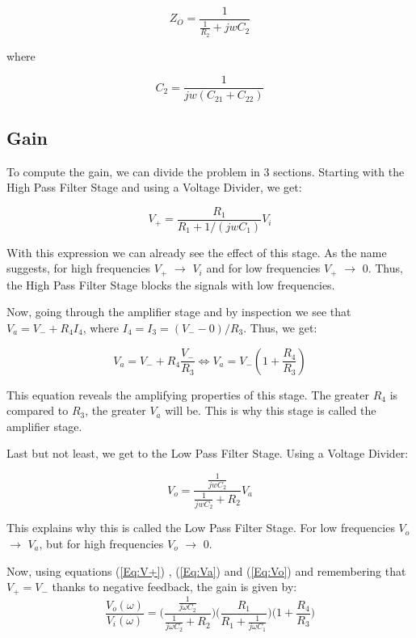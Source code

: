 \begin{equation}
Z_{O}=\frac{1}{\frac{1}{R_2}+jwC_2}
\end{equation}

where

\begin{equation}
C_2=\frac{1}{jw(C_{21}+C_{22})}
\end{equation}

\subsection{Gain}

To compute the gain, we can divide the problem in 3 sections. Starting with the High Pass Filter Stage and using a Voltage Divider, we get:

\begin{equation}
V_{+}=\frac{R_1}{R_1+1/(jwC_1)}V_i
\label{Eq:V+}
\end{equation}

With this expression we can already see the effect of this stage. As the name suggests, for high frequencies $V_{+}$ $\to$ $V_i$ and for low frequencies $V_{+}$ $\to$ $0$.
Thus, the High Pass Filter Stage blocks the signals with low frequencies.

Now, going through the amplifier stage and by inspection we see that $V_a=V_{-}+R_4I_4$, where $I_4=I_3=(V_{-}-0)/R_3$. Thus, we get:

\begin{equation}
V_a=V_{-}+R_4\frac{V_{-}}{R_3}  \Leftrightarrow V_a = V_{-}\left(1+\frac{R_4}{R_3}\right)
\label{Eq:Va}
\end{equation}

This equation reveals the amplifying properties of this stage. The greater $R_4$ is compared to $R_3$, the greater $V_a$ will be. This is why this stage is called the amplifier stage.\par

Last but not least, we get to the Low Pass Filter Stage. Using a Voltage Divider:

\begin{equation}
  V_o=\frac{\frac{1}{jwC_2}}{\frac{1}{jwC_2}+R_2}V_a
\label{Eq:Vo}
\end{equation}

This explains why this is called the Low Pass Filter Stage. For low frequencies $V_o$ $\to$ $V_a$, but for high frequencies $V_o$ $\to$ $0$.\par

Now, using equations (\ref{Eq:V+}) , (\ref{Eq:Va}) and (\ref{Eq:Vo}) and remembering that $V_{+}=V_{-}$ thanks to negative feedback, the gain is given by:
\begin{equation}
\frac{V_o(\omega)}{V_i(\omega)}=\Bigg( \frac{ \frac{1}{j\omega C_2}}{\frac{1}{j\omega C_2}+R_2} \Bigg) \Bigg( \frac{R_1}{R_1+\frac{1}{j\omega C_1}}   \Bigg)  \Bigg( 1+\frac{R_4}{R_3}  \Bigg)
\end{equation}


